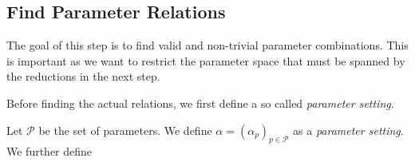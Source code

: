 \subsection{Find Parameter Relations}
The goal of this step is to find valid and non-trivial parameter combinations.
This is important as we want to restrict the parameter space that must be spanned by the reductions in the next step.

Before finding the actual relations, we first define a so called \emph{parameter setting}.

\begin{definition}
Let $\mathcal{P}$ be the set of parameters.
We define $\mathbb{\alpha} = (\alpha_p)_{p \in \mathcal{P}}$ as a \emph{parameter setting}.
We further define \lc
\end{definition}
